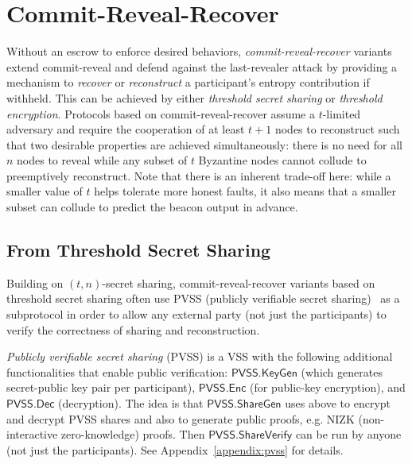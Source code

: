 
\section{Commit-Reveal-Recover}
\label{section:commit-reveal-recover}
Without an escrow to enforce desired behaviors, \textit{commit-reveal-recover} variants extend commit-reveal and defend against the last-revealer attack by providing a mechanism to \textit{recover} or \textit{reconstruct} a participant's entropy contribution if withheld.
This can be achieved by either \textit{threshold secret sharing} or \textit{threshold encryption}.
Protocols based on commit-reveal-recover assume a $t$-limited adversary and require the cooperation of at least $t + 1$ nodes to reconstruct such that two desirable properties are achieved simultaneously: there is no need for all $n$ nodes to reveal while any subset of $t$ Byzantine nodes cannot collude to preemptively reconstruct.
Note that there is an inherent trade-off here: while a smaller value of $t$ helps tolerate more honest faults, it also means that a smaller subset can collude to predict the beacon output in advance.

\subsection{From Threshold Secret Sharing}
Building on $(t, n)$-secret sharing, commit-reveal-recover variants based on threshold secret sharing often use PVSS (publicly verifiable secret sharing)~\cite{schoenmakers1999simple, cascudo2017scrape} as a subprotocol in order to allow any external party (not just the participants) to verify the correctness of sharing and reconstruction.

\begin{definition}
\textit{Publicly verifiable secret sharing} (PVSS) is a VSS with the following additional functionalities that enable public verification: $\mathsf{PVSS.KeyGen}$ (which generates secret-public key pair per participant), $\mathsf{PVSS.Enc}$ (for public-key encryption), and $\mathsf{PVSS.Dec}$ (decryption).
The idea is that $\mathsf{PVSS.ShareGen}$ uses above to encrypt and decrypt PVSS shares and also to generate public proofs, e.g. NIZK (non-interactive zero-knowledge) proofs.
Then $\mathsf{PVSS.ShareVerify}$ can be run by anyone (not just the participants).
See Appendix~\ref{appendix:pvss} for details.
\end{definition}

